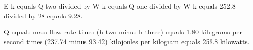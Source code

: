 E k equals Q two divided by W k equals Q one divided by W k equals 252.8 divided by 28 equals 9.28.  

Q equals mass flow rate times (h two minus h three) equals 1.80 kilograms per second times (237.74 minus 93.42) kilojoules per kilogram equals 258.8 kilowatts.